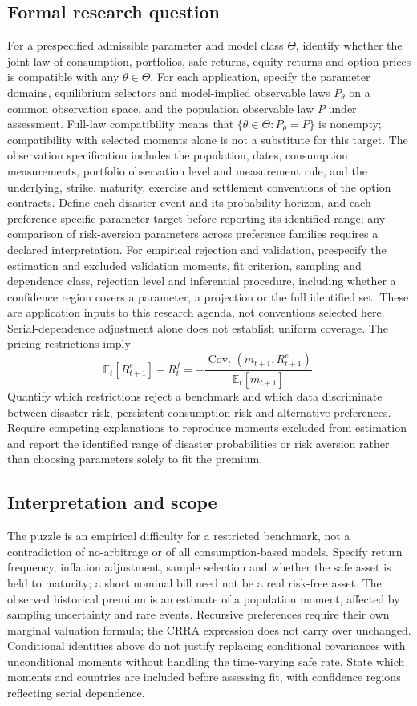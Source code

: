 \documentclass[11pt,a4paper]{article}
\begin{document}
\subsection*{Formal research question}
For a prespecified admissible parameter and model class $\Theta$, identify whether the joint law of consumption, portfolios, safe returns, equity returns and option prices is compatible with any $\theta\in\Theta$. For each application, specify the parameter domains, equilibrium selectors and model-implied observable laws $P_\theta$ on a common observation space, and the population observable law $P$ under assessment. Full-law compatibility means that $\{\theta\in\Theta:P_\theta=P\}$ is nonempty; compatibility with selected moments alone is not a substitute for this target. The observation specification includes the population, dates, consumption measurements, portfolio observation level and measurement rule, and the underlying, strike, maturity, exercise and settlement conventions of the option contracts. Define each disaster event and its probability horizon, and each preference-specific parameter target before reporting its identified range; any comparison of risk-aversion parameters across preference families requires a declared interpretation. For empirical rejection and validation, prespecify the estimation and excluded validation moments, fit criterion, sampling and dependence class, rejection level and inferential procedure, including whether a confidence region covers a parameter, a projection or the full identified set. These are application inputs to this research agenda, not conventions selected here. Serial-dependence adjustment alone does not establish uniform coverage. The pricing restrictions imply
\[
 \mathbb E_t[R_{t+1}^e]-R_t^f
 =-\frac{\operatorname{Cov}_t(m_{t+1},R_{t+1}^e)}{\mathbb E_t[m_{t+1}]}.
\]
Quantify which restrictions reject a benchmark and which data discriminate between disaster risk, persistent consumption risk and alternative preferences. Require competing explanations to reproduce moments excluded from estimation and report the identified range of disaster probabilities or risk aversion rather than choosing parameters solely to fit the premium.

\subsection*{Interpretation and scope}
The puzzle is an empirical difficulty for a restricted benchmark, not a contradiction of no-arbitrage or of all consumption-based models. Specify return frequency, inflation adjustment, sample selection and whether the safe asset is held to maturity; a short nominal bill need not be a real risk-free asset. The observed historical premium is an estimate of a population moment, affected by sampling uncertainty and rare events. Recursive preferences require their own marginal valuation formula; the CRRA expression does not carry over unchanged. Conditional identities above do not justify replacing conditional covariances with unconditional moments without handling the time-varying safe rate. State which moments and countries are included before assessing fit, with confidence regions reflecting serial dependence.
\end{document}
